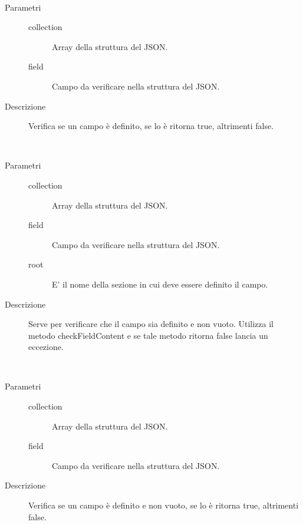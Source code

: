 \begin{description}
\begin{mldescription}
  \hfill \\ 
 \begin{description}
     		\item[Parametri] \hfill
     			\begin{description}
     				\item[collection]
     			     Array della struttura del JSON.
     			    \item[field]
     			     Campo da verificare nella struttura del JSON.
     			\end{description}
     		\item[Descrizione]
     		Verifica se un campo è definito, se lo è ritorna true, altrimenti false.
  \end{description}
  \hfill \\ 
 \begin{description}
     		\item[Parametri] \hfill
     			\begin{description}
     				\item[collection]
     				 Array della struttura del JSON.
     				\item[field]
     				 Campo da verificare nella struttura del JSON.
     				\item[root]
     				 E' il nome della sezione in cui deve essere definito il campo.
     			\end{description}
     		\item[Descrizione]
     		Serve per verificare che il campo sia definito e non vuoto. Utilizza il metodo checkFieldContent e se tale metodo ritorna false lancia un eccezione.
  \end{description}
  \hfill \\ 
 \begin{description}
     		\item[Parametri] \hfill
     			\begin{description}
     				\item[collection]
     				 Array della struttura del JSON.
       			    \item[field]
       			     Campo da verificare nella struttura del JSON.
     			\end{description}
     		\item[Descrizione]
     		Verifica se un campo è definito e non vuoto, se lo è ritorna true, altrimenti false.
  \end{description}
  \hfill \\


\end{mldescription}
\end{description}
